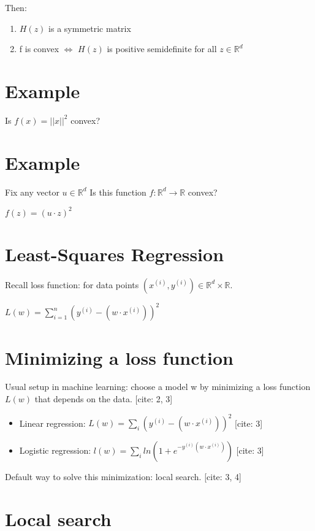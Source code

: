 \documentclass{article}
\begin{document}
Then:

\begin{enumerate}
    \item $H(z)$ is a symmetric matrix
    \item f is convex $\Leftrightarrow$ $H(z)$ is positive semidefinite for all $z\in\mathbb{R}^{d}$
\end{enumerate}

\section{Example}

Is $f(x)=||x||^{2}$ convex?

\section{Example}

Fix any vector $u\in\mathbb{R}^{d}$ Is this function $f:\mathbb{R}^{d}\rightarrow\mathbb{R}$ convex?

$f(z)=(u\cdot z)^{2}$

\section{Least-Squares Regression}

Recall loss function: for data points $(x^{(i)},y^{(i)})\in\mathbb{R}^{d}\times\mathbb{R}$.

$L(w)=\sum_{i=1}^{n}(y^{(i)}-(w\cdot x^{(i)}))^{2}$

\section{Minimizing a loss function}

Usual setup in machine learning: choose a model w by minimizing a loss function $L(w)$ that depends on the data. [cite: 2, 3]

\begin{itemize}
    \item Linear regression: $L(w)=\sum_{i}(y^{(i)}-(w\cdot x^{(i)}))^{2}$  [cite: 3]
    \item Logistic regression: $l(w)=\sum_{i}ln(1+e^{-y^{(i)}(w\cdot x^{(i)})})$ [cite: 3]
\end{itemize}

Default way to solve this minimization: local search. [cite: 3, 4]

\section{Local search}
\end{document}
